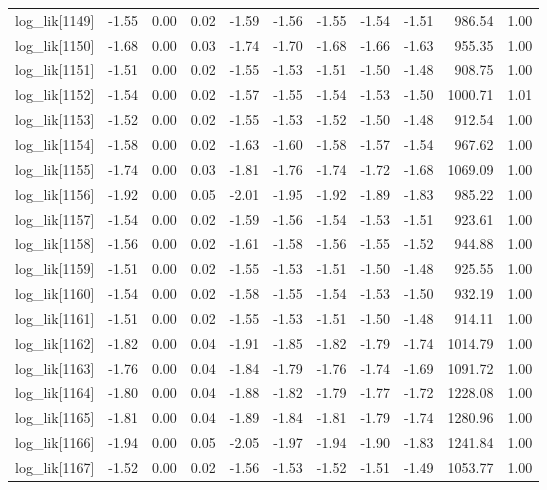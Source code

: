 \begin{table}[ht]
\begin{tabular}{rrrrrrrrrrr}
  log\_lik[1149] & -1.55 & 0.00 & 0.02 & -1.59 & -1.56 & -1.55 & -1.54 & -1.51 & 986.54 & 1.00 \\ 
  log\_lik[1150] & -1.68 & 0.00 & 0.03 & -1.74 & -1.70 & -1.68 & -1.66 & -1.63 & 955.35 & 1.00 \\ 
  log\_lik[1151] & -1.51 & 0.00 & 0.02 & -1.55 & -1.53 & -1.51 & -1.50 & -1.48 & 908.75 & 1.00 \\ 
  log\_lik[1152] & -1.54 & 0.00 & 0.02 & -1.57 & -1.55 & -1.54 & -1.53 & -1.50 & 1000.71 & 1.01 \\ 
  log\_lik[1153] & -1.52 & 0.00 & 0.02 & -1.55 & -1.53 & -1.52 & -1.50 & -1.48 & 912.54 & 1.00 \\ 
  log\_lik[1154] & -1.58 & 0.00 & 0.02 & -1.63 & -1.60 & -1.58 & -1.57 & -1.54 & 967.62 & 1.00 \\ 
  log\_lik[1155] & -1.74 & 0.00 & 0.03 & -1.81 & -1.76 & -1.74 & -1.72 & -1.68 & 1069.09 & 1.00 \\ 
  log\_lik[1156] & -1.92 & 0.00 & 0.05 & -2.01 & -1.95 & -1.92 & -1.89 & -1.83 & 985.22 & 1.00 \\ 
  log\_lik[1157] & -1.54 & 0.00 & 0.02 & -1.59 & -1.56 & -1.54 & -1.53 & -1.51 & 923.61 & 1.00 \\ 
  log\_lik[1158] & -1.56 & 0.00 & 0.02 & -1.61 & -1.58 & -1.56 & -1.55 & -1.52 & 944.88 & 1.00 \\ 
  log\_lik[1159] & -1.51 & 0.00 & 0.02 & -1.55 & -1.53 & -1.51 & -1.50 & -1.48 & 925.55 & 1.00 \\ 
  log\_lik[1160] & -1.54 & 0.00 & 0.02 & -1.58 & -1.55 & -1.54 & -1.53 & -1.50 & 932.19 & 1.00 \\ 
  log\_lik[1161] & -1.51 & 0.00 & 0.02 & -1.55 & -1.53 & -1.51 & -1.50 & -1.48 & 914.11 & 1.00 \\ 
  log\_lik[1162] & -1.82 & 0.00 & 0.04 & -1.91 & -1.85 & -1.82 & -1.79 & -1.74 & 1014.79 & 1.00 \\ 
  log\_lik[1163] & -1.76 & 0.00 & 0.04 & -1.84 & -1.79 & -1.76 & -1.74 & -1.69 & 1091.72 & 1.00 \\ 
  log\_lik[1164] & -1.80 & 0.00 & 0.04 & -1.88 & -1.82 & -1.79 & -1.77 & -1.72 & 1228.08 & 1.00 \\ 
  log\_lik[1165] & -1.81 & 0.00 & 0.04 & -1.89 & -1.84 & -1.81 & -1.79 & -1.74 & 1280.96 & 1.00 \\ 
  log\_lik[1166] & -1.94 & 0.00 & 0.05 & -2.05 & -1.97 & -1.94 & -1.90 & -1.83 & 1241.84 & 1.00 \\ 
  log\_lik[1167] & -1.52 & 0.00 & 0.02 & -1.56 & -1.53 & -1.52 & -1.51 & -1.49 & 1053.77 & 1.00 \\ 

\end{tabular}
\end{table}

